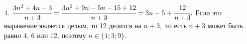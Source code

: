 4. $\cfrac{3n^2+4n-3}{n+3}=\cfrac{3n^2+9n-5n-15+12}{n+3}=3n-5+\cfrac{12}{n+3}.$ Если это выражение является целым, то 12 делится на $n+3,$ то есть $n+3$ может быть равно 4, 6 или 12, поэтому $n\in \{1;3;9\}.$\\
